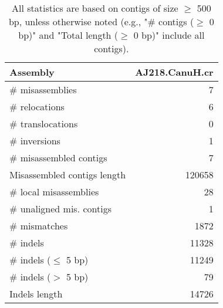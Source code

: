 \documentclass[12pt,a4paper]{article}
\begin{document}
\begin{table}[ht]
\begin{center}
\caption{All statistics are based on contigs of size $\geq$ 500 bp, unless otherwise noted (e.g., "\# contigs ($\geq$ 0 bp)" and "Total length ($\geq$ 0 bp)" include all contigs).}
\begin{tabular}{|l*{1}{|r}|}
\hline
Assembly & AJ218.CanuH.cr \\ \hline
\# misassemblies & 7 \\ \hline
\hspace{5mm}\# relocations & 6 \\ \hline
\hspace{5mm}\# translocations & 0 \\ \hline
\hspace{5mm}\# inversions & 1 \\ \hline
\# misassembled contigs & 7 \\ \hline
Misassembled contigs length & 120658 \\ \hline
\# local misassemblies & 28 \\ \hline
\# unaligned mis. contigs & 1 \\ \hline
\# mismatches & 1872 \\ \hline
\# indels & 11328 \\ \hline
\hspace{5mm}\# indels ($\leq$ 5 bp) & 11249 \\ \hline
\hspace{5mm}\# indels ($>$ 5 bp) & 79 \\ \hline
Indels length & 14726 \\ \hline
\end{tabular}
\end{center}
\end{table}
\end{document}

